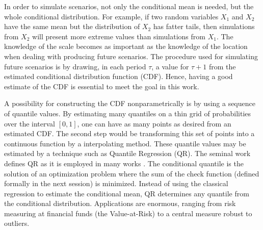 In order to simulate scenarios, not only the conditional mean is needed, but the whole conditional distribution. For example, if two random variables $X_1$ and $X_2$ have the same mean but the distribution of $X_2$ has fatter tails, then simulations from $X_2$ will present more extreme values than simulations from $X_1$. The knowledge of the scale becomes as important as the knowledge of the location when dealing with producing future scenarios. The procedure used for simulating future scenarios is by drawing, in each period $\tau$, a value for $\tau+1$ from the estimated conditional distribution function (CDF). Hence, having a good estimate of the CDF is essential to meet the goal in this work. 

A possibility for constructing the CDF nonparametrically is by using a sequence of quantile values. By estimating many quantiles on a thin grid of probabilities over the interval $[0,1]$, one can have as many points as desired from an estimated CDF. The second step would be transforming this set of points into a continuous function by a interpolating method. 
These quantile values may be estimated by a technique such as Quantile Regression (QR). 
The seminal work \cite{koenker1978regression} defines QR as it is employed in many works \cite{chao_quantile_2012,li_quantile_2007,bosch_convergent_nodate,gallego2016line,moller_time-adaptive_2008,nielsen2006,bremnes_probabilistic_2004,wan_direct_2017}. The conditional quantile is the solution of an optimization problem where the sum of the check function (defined formally in the next session) is minimized. Instead of using the classical regression to estimate the conditional mean, QR determines any quantile from the conditional distribution. Applications are enormous, ranging from risk measuring at financial funds (the Value-at-Risk) to a central measure robust to outliers.







